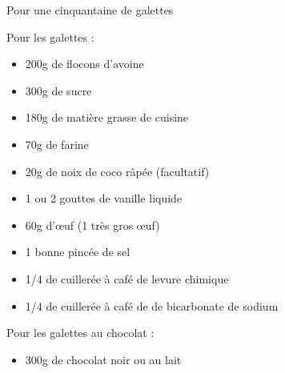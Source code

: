 \bigskip
{}
{Pour une cinquantaine de galettes}{Pour les galettes :
\begin{itemize}
\item 200g de flocons d'avoine
\item 300g de sucre
\item 180g de matière grasse de cuisine
\item 70g de farine
\item 20g de noix de coco râpée (facultatif)
\item 1 ou 2 gouttes de vanille liquide
\item 60g d'\oe uf (1 très gros \oe uf)
\item 1 bonne pincée de sel
\item 1/4 de cuillerée à café de levure chimique
\item 1/4 de cuillerée à café de de bicarbonate de sodium
\end{itemize}
Pour les galettes au chocolat :
\begin{itemize}
\item 300g de chocolat noir ou au lait
\end{itemize}}
